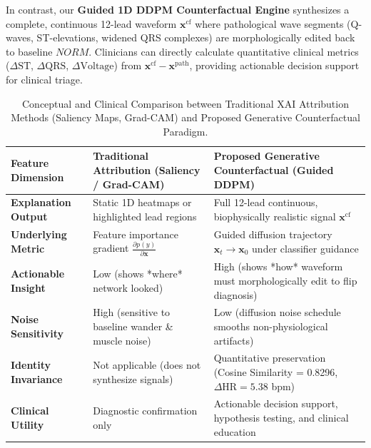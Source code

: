 \documentclass[12pt]{elsarticle}
\begin{document}
In contrast, our \textbf{Guided 1D DDPM Counterfactual Engine} synthesizes a complete, continuous 12-lead waveform $\mathbf{x}^{\text{cf}}$ where pathological wave segments (Q-waves, ST-elevations, widened QRS complexes) are morphologically edited back to baseline $NORM$. Clinicians can directly calculate quantitative clinical metrics ($\Delta\text{ST}$, $\Delta\text{QRS}$, $\Delta\text{Voltage}$) from $\mathbf{x}^{\text{cf}} - \mathbf{x}^{\text{path}}$, providing actionable decision support for clinical triage.

\begin{table}[t]
\caption{Conceptual and Clinical Comparison between Traditional XAI Attribution Methods (Saliency Maps, Grad-CAM) and Proposed Generative Counterfactual Paradigm.}
\label{tab:xai_comparison}
\centering
\small
\begin{tabular}{lp{5.2cm}p{6.5cm}}
\toprule
\textbf{Feature Dimension} & \textbf{Traditional Attribution (Saliency / Grad-CAM)} & \textbf{Proposed Generative Counterfactual (Guided DDPM)} \\
\midrule
\textbf{Explanation Output} & Static 1D heatmaps or highlighted lead regions & Full 12-lead continuous, biophysically realistic signal $\mathbf{x}^{\text{cf}}$ \\
\textbf{Underlying Metric} & Feature importance gradient $\frac{\partial p(y)}{\partial \mathbf{x}}$ & Guided diffusion trajectory $\mathbf{x}_t \to \mathbf{x}_0$ under classifier guidance \\
\textbf{Actionable Insight} & Low (shows *where* network looked) & High (shows *how* waveform must morphologically edit to flip diagnosis) \\
\textbf{Noise Sensitivity} & High (sensitive to baseline wander \& muscle noise) & Low (diffusion noise schedule smooths non-physiological artifacts) \\
\textbf{Identity Invariance} & Not applicable (does not synthesize signals) & Quantitative preservation (Cosine Similarity = 0.8296, $\Delta\text{HR} = 5.38$ bpm) \\
\textbf{Clinical Utility} & Diagnostic confirmation only & Actionable decision support, hypothesis testing, and clinical education \\
\bottomrule
\end{tabular}
\end{table}
\end{document}

